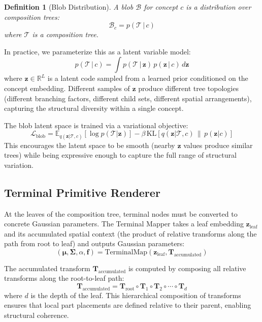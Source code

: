 \documentclass[11pt]{article}
\newtheorem{definition}{Definition}
\begin{document}
\begin{definition}[Blob Distribution]
A blob $\mathcal{B}$ for concept $c$ is a distribution over composition trees:
\begin{equation}
\mathcal{B}_c = p(\mathcal{T} \,|\, c)
\end{equation}
where $\mathcal{T}$ is a composition tree.
\end{definition}

In practice, we parameterize this as a latent variable model:
\begin{equation}
p(\mathcal{T} \,|\, c) = \int p(\mathcal{T} \,|\, \mathbf{z}) \, p(\mathbf{z} \,|\, c) \, d\mathbf{z}
\end{equation}
where $\mathbf{z} \in \mathbb{R}^L$ is a latent code sampled from a learned prior conditioned on the concept embedding. Different samples of $\mathbf{z}$ produce different tree topologies (different branching factors, different child sets, different spatial arrangements), capturing the structural diversity within a single concept.

The blob latent space is trained via a variational objective:
\begin{equation}
\mathcal{L}_{\text{blob}} = \mathbb{E}_{q(\mathbf{z}|\mathcal{T},c)}[\log p(\mathcal{T}|\mathbf{z})] - \beta \, \text{KL}[q(\mathbf{z}|\mathcal{T},c) \,\|\, p(\mathbf{z}|c)]
\end{equation}
This encourages the latent space to be smooth (nearby $\mathbf{z}$ values produce similar trees) while being expressive enough to capture the full range of structural variation.

\subsection{Terminal Primitive Renderer}

At the leaves of the composition tree, terminal nodes must be converted to concrete Gaussian parameters. The Terminal Mapper takes a leaf embedding $\mathbf{z}_{\text{leaf}}$ and its accumulated spatial context (the product of relative transforms along the path from root to leaf) and outputs Gaussian parameters:
\begin{equation}
(\boldsymbol{\mu}, \boldsymbol{\Sigma}, \alpha, \mathbf{f}) = \text{TerminalMap}(\mathbf{z}_{\text{leaf}}, \mathbf{T}_{\text{accumulated}})
\end{equation}

The accumulated transform $\mathbf{T}_{\text{accumulated}}$ is computed by composing all relative transforms along the root-to-leaf path:
\begin{equation}
\mathbf{T}_{\text{accumulated}} = \mathbf{T}_{\text{root}} \circ \mathbf{T}_1 \circ \mathbf{T}_2 \circ \cdots \circ \mathbf{T}_d
\end{equation}
where $d$ is the depth of the leaf. This hierarchical composition of transforms ensures that local part placements are defined relative to their parent, enabling structural coherence.
\end{document}
